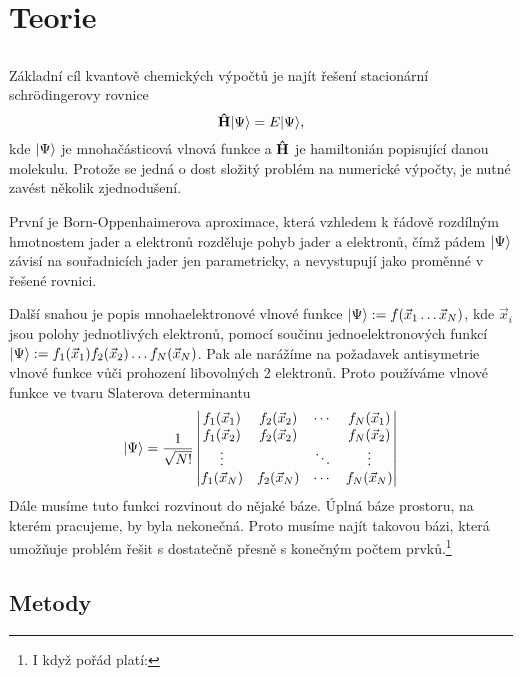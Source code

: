 \chapter{Teorie}
\section{\TD}
Základní cíl kvantově chemických výpočtů je najít řešení stacionární schrödingerovy rovnice
\begin{equation}
\mathbf{\hat{H}}| \Psi \rangle = E| \Psi \rangle,
\end{equation}
kde $| \Psi \rangle$ je mnohačásticová vlnová funkce a $\mathbf{\hat{H}}$ je hamiltonián popisující 
danou molekulu.
Protože se jedná o dost složitý problém na numerické výpočty, je nutné zavést 
několik zjednodušení. 

První je Born-Oppenhaimerova aproximace, která vzhledem k řádově 
rozdílným hmotnostem jader a elektronů rozděluje pohyb jader a elektronů, čímž pádem 
$| \Psi \rangle$ závisí na souřadnicích jader jen parametricky, 
a nevystupují jako proměnné v 
řešené rovnici. 

Další snahou je popis mnohaelektronové vlnové funkce
$| \Psi \rangle:= f(\vec{x}_1 \dots \vec{x}_N)$, kde $\vec{x}_i$ jsou 
polohy jednotlivých elektronů, pomocí součinu jednoelektronových funkcí
$| \Psi \rangle:= f_1(\vec{x}_1)f_2(\vec{x}_2)\dots f_N(\vec{x}_N)$.
Pak ale narážíme na požadavek antisymetrie vlnové funkce vůči prohození libovolných 2 
elektronů. Proto používáme vlnové funkce ve tvaru Slaterova determinantu
\begin{equation}
| \Psi \rangle = \frac{1}{\sqrt{N!}}\begin{vmatrix}
f_1(\vec{x}_1) & f_2(\vec{x}_2)& \cdots & f_N(\vec{x}_1) \\
f_1(\vec{x}_2) & f_2(\vec{x}_2)&        & f_N(\vec{x}_2)\\
\vdots         &               & \ddots & \vdots \\
f_1(\vec{x}_N) & f_2(\vec{x}_N)& \cdots & f_N(\vec{x}_N)
\end{vmatrix}
\end{equation}
Dále musíme tuto funkci rozvinout do nějaké báze. Úplná báze prostoru, na kterém 
pracujeme, by byla nekonečná. Proto musíme najít takovou bázi, která umožňuje problém 
řešit s dostatečně přesně s konečným počtem prvků.\footnote{I když pořád platí: }
\section{Metody}
